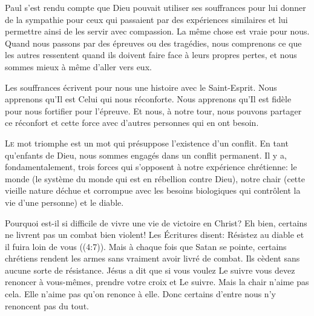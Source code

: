 Paul s'est rendu compte que Dieu pouvait utiliser
 ses souffrances pour lui donner de la sympathie
 pour ceux qui passaient par des expériences similaires
 et lui permettre ainsi de les servir avec compassion.
 La même chose est vraie pour nous.
 Quand nous passons par des épreuves ou des tragédies,
 nous comprenons ce que les autres ressentent
 quand ils doivent faire face à leurs propres pertes,
 et nous sommes mieux à même d'aller vers eux.

Les souffrances écrivent pour nous une histoire
 avec le Saint-Esprit.
 Nous apprenons qu'Il est Celui qui nous réconforte.
 Nous apprenons qu'Il est fidèle pour nous fortifier pour l'épreuve.
 Et nous, à notre tour, nous pouvons partager ce réconfort
 et cette force avec d'autres personnes qui en ont besoin.

\dvrule








\lettrine{L}{e} mot \Og triomphe \Fg{}
 est un mot qui présuppose l'existence d'un conflit.
 En tant qu'enfants de Dieu,
 nous sommes engagés dans un conflit permanent.
 Il y a, fondamentalement, trois forces qui s'opposent
 à notre expérience chrétienne: le monde
 (le système du monde qui est en rébellion contre Dieu),
 notre chair (cette vieille nature déchue et corrompue
 avec les besoins biologiques qui contrôlent
 la vie d'une personne) et le diable.


Pourquoi est-il si difficile de vivre une vie de victoire en Christ?
 Eh bien, certains ne livrent pas un combat bien violent!
 Les Écritures disent: 
 \Og Résistez au diable et il fuira loin de vous \Fg{}
 ((4:7)).
 Mais à chaque fois que Satan se pointe, certains chrétiens rendent
 les armes sans vraiment avoir livré de combat.
 Ils cèdent sans aucune sorte de résistance.
 Jésus a dit que si vous voulez Le suivre vous devez renoncer à vous-mêmes,
 prendre votre croix et Le suivre.
 Mais la chair n'aime pas cela. Elle n'aime pas qu'on renonce à elle.
 Donc certains d'entre nous n'y renoncent pas du tout.

